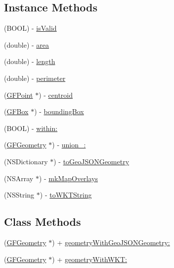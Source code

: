 \subsection*{Instance Methods}
\begin{DoxyCompactItemize}
\item 
(B\+O\+O\+L) -\/ \hyperlink{interface_g_f_geometry_a3a63de5905eae52356c6afd7313e4828}{is\+Valid}
\item 
(double) -\/ \hyperlink{interface_g_f_geometry_a0028dc3b2c2315a24d803dfa4cf2250e}{area}
\item 
(double) -\/ \hyperlink{interface_g_f_geometry_ab68dd3c418a3f06c6593d02dfebe2585}{length}
\item 
(double) -\/ \hyperlink{interface_g_f_geometry_a31593eea12da7a9ed46b2dd4e6ca511e}{perimeter}
\item 
(\hyperlink{interface_g_f_point}{G\+F\+Point} $\ast$) -\/ \hyperlink{interface_g_f_geometry_af53b7bf19dfea6827eed19a7979c7dca}{centroid}
\item 
(\hyperlink{interface_g_f_box}{G\+F\+Box} $\ast$) -\/ \hyperlink{interface_g_f_geometry_a808ba7daf6d4c3d742668ad3fe5d0f0e}{bounding\+Box}
\item 
(B\+O\+O\+L) -\/ \hyperlink{interface_g_f_geometry_a832350c76f4a42a39889c9138108edd2}{within\+:}
\item 
(\hyperlink{interface_g_f_geometry}{G\+F\+Geometry} $\ast$) -\/ \hyperlink{interface_g_f_geometry_a58c32fcf4a3932281498d1a1b25fb46b}{union\+\_\+\+:}
\item 
(N\+S\+Dictionary $\ast$) -\/ \hyperlink{interface_g_f_geometry_a89a1dd53c1d9a51fd5b933fde28be5b7}{to\+Geo\+J\+S\+O\+N\+Geometry}
\item 
(N\+S\+Array $\ast$) -\/ \hyperlink{interface_g_f_geometry_a69a56e7786e1de09034c546ade1c7262}{mk\+Map\+Overlays}
\item 
(N\+S\+String $\ast$) -\/ \hyperlink{interface_g_f_geometry_a9d257cce05d031211e2cece24b5530e4}{to\+W\+K\+T\+String}
\end{DoxyCompactItemize}
\subsection*{Class Methods}
\begin{DoxyCompactItemize}
\item 
(\hyperlink{interface_g_f_geometry}{G\+F\+Geometry} $\ast$) + \hyperlink{interface_g_f_geometry_afcdd23bd5dd4b04868d6baf577f9bb32}{geometry\+With\+Geo\+J\+S\+O\+N\+Geometry\+:}
\item 
(\hyperlink{interface_g_f_geometry}{G\+F\+Geometry} $\ast$) + \hyperlink{interface_g_f_geometry_a26ad5ae365b4dd4847fdb3370dfb6bb2}{geometry\+With\+W\+K\+T\+:}
\end{DoxyCompactItemize}


